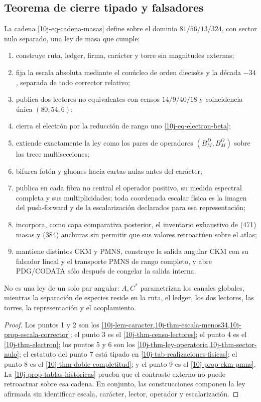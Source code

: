 \subsection{Teorema de cierre tipado y falsadores}

\begin{theorem}
\label{10j-thm-ley-general}
La cadena \eqref{10j-eq-cadena-masas} define sobre el dominio
\(81/56/13/324\), con sector nulo separado, una ley de masa que cumple:
\begin{enumerate}
 \item construye ruta, ledger, firma, carácter y torre sin magnitudes
 externas;
 \item fija la escala absoluta mediante el conúcleo de orden dieciséis y la
 década \(-34\), separada de todo corrector relativo;
 \item publica dos lectores no equivalentes con censos
 \(14/9/40/18\) y coincidencia única \((80,54,6)\);
 \item cierra el electrón por la reducción de rango uno
 \eqref{10j-eq-electron-beta};
 \item extiende exactamente la ley como los pares de operadores
 \((B_M^D,B_M^\Omega)\) sobre las trece multisecciones;
 \item bifurca fotón y gluones hacia cartas nulas antes del carácter;
 \item publica en cada fibra no central el operador positivo, su medida
 espectral completa y sus multiplicidades; toda coordenada escalar física es
 la imagen del push-forward y de la escalarización declarados para esa
 representación;
 \item incorpora, como capa comparativa posterior, el inventario exhaustivo de
 (471) masas y (384) anchuras sin permitir que sus valores retroactúen
 sobre el atlas;
 \item mantiene distintos CKM y PMNS, construye la salida angular CKM con su
 falsador lineal y el transporte PMNS de rango completo, y abre PDG/CODATA
 sólo después de congelar la salida interna.
\end{enumerate}
No es una ley de un solo par angular: \(A,C^*\) parametrizan los canales
globales, mientras la separación de especies reside en la ruta, el ledger,
los dos lectores, las torres, la representación y el acoplamiento.
\end{theorem}

\begin{proof}
Los puntos 1 y 2 son los
\cref{10j-lem-caracter,10j-thm-escala-menos34,10j-prop-escala-corrector};
el punto 3 es el \cref{10j-thm-censo-lectores}; el punto 4 es el
\cref{10j-thm-electron}; los puntos 5 y 6 son los
\cref{10j-thm-ley-operatoria,10j-thm-sector-nulo}; el estatuto del punto 7
está tipado en \cref{10j-tab-realizaciones-fisicas}; el punto 8 es el
\cref{10j-thm-doble-completitud}; y el punto 9 es el
\cref{10j-prop-ckm-pmns}. La
\cref{10j-prop-tablas-historicas} prueba que el contraste externo no puede
retroactuar sobre esa cadena. En conjunto, las construcciones componen la
ley afirmada sin identificar escala, carácter, lector, operador y
escalarización.
\end{proof}

